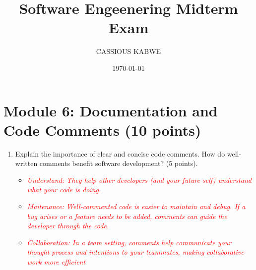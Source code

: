 \documentclass{article}
\title{Software Engeenering Midterm Exam}
\author{CASSIOUS KABWE}
\date{\today}
\begin{document}
\maketitle

\section{Module 6: Documentation and Code Comments (10 points)}
    \begin{enumerate}
        \item Explain the importance of clear and concise code comments. How do
        well-written comments benefit software development? (5 points). \par
        \begin{itemize}
            \item \textcolor{red}{\textit{Understand: They help other developers (and your future self) understand what your code is doing.}} \par
            \item \textcolor{red}{\textit{Maitenance: Well-commented code is easier to maintain and debug. 
            If a bug arises or a feature needs to be added, comments can guide the developer through the code.}} \par
            \item \textcolor{red}{\textit{Collaboration: In a team setting, comments help communicate your 
            thought process and intentions to your teammates, making collaborative work more efficient}}
        \end{itemize}


\end{enumerate}
\end{document}

